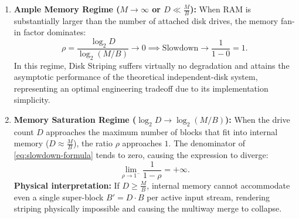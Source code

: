 \begin{enumerate}
  \item \textbf{Ample Memory Regime ($M \to \infty$ or $D \ll \frac{M}{B}$):}
  When RAM is substantially larger than the number of attached disk drives, the memory fan-in factor dominates:
  \begin{equation}
    \rho = \frac{\log_2 D}{\log_2(M / B)} \to 0 \implies \text{Slowdown} \to \frac{1}{1 - 0} = 1.
  \end{equation}
  In this regime, Disk Striping suffers virtually no degradation and attains the asymptotic performance of the theoretical independent-disk system, representing an optimal engineering tradeoff due to its implementation simplicity.

  \item \textbf{Memory Saturation Regime ($\log_2 D \to \log_2(M/B)$):}
  When the drive count $D$ approaches the maximum number of blocks that fit into internal memory ($D \approx \frac{M}{B}$), the ratio $\rho$ approaches $1$. The denominator of \eqref{eq:slowdown-formula} tends to zero, causing the expression to diverge:
  \begin{equation}
    \lim_{\rho \to 1^-} \frac{1}{1 - \rho} = +\infty.
  \end{equation}
  \textbf{Physical interpretation:} If $D \ge \frac{M}{B}$, internal memory cannot accommodate even a single super-block $B' = D \cdot B$ per active input stream, rendering striping physically impossible and causing the multiway merge to collapse.
\end{enumerate}

